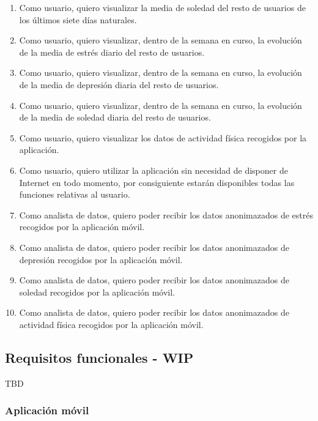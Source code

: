 \begin{enumerate}[label=\textbf{\texttt{RU-\arabic*}}]
            \item Como usuario, quiero visualizar la media de soledad del resto de usuarios de los últimos siete días naturales.
            \item Como usuario, quiero visualizar, dentro de la semana en curso, la evolución de la media de estrés diario del resto de usuarios.
            \item Como usuario, quiero visualizar, dentro de la semana en curso, la evolución de la media de depresión diaria del resto de usuarios.
            \item Como usuario, quiero visualizar, dentro de la semana en curso, la evolución de la media de soledad diaria del resto de usuarios.
            \item Como usuario, quiero visualizar los datos de actividad física recogidos por la aplicación.
            \item Como usuario, quiero utilizar la aplicación sin necesidad de disponer de Internet en todo momento, por consiguiente estarán disponibles todas las funciones relativas al usuario.
            \item Como analista de datos, quiero poder recibir los datos anonimazados de estrés recogidos por la aplicación móvil.
            \item Como analista de datos, quiero poder recibir los datos anonimazados de depresión recogidos por la aplicación móvil.
            \item Como analista de datos, quiero poder recibir los datos anonimazados de soledad recogidos por la aplicación móvil.
            \item Como analista de datos, quiero poder recibir los datos anonimazados de actividad física recogidos por la aplicación móvil.
        \end{enumerate}
    
    \subsection{Requisitos funcionales - WIP}
        \label{req:especificos:funcionales}
        
        TBD

        \subsubsection{Aplicación móvil}

